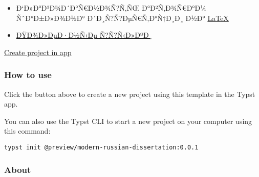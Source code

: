 \begin{itemize}
\item
  Ð`Ð»Ð°Ð³Ð¾Ð´Ð°Ñ€Ð½Ð¾Ñ?Ñ‚ÑŒ Ð°Ð²Ñ‚Ð¾Ñ€Ð°Ð¼ ÑˆÐ°Ð±Ð»Ð¾Ð½Ð°
  Ð´Ð¸Ñ?Ñ?ÐµÑ€Ñ‚Ð°Ñ†Ð¸Ð¸ Ð½Ð°
  \href{https://github.com/AndreyAkinshin/Russian-Phd-LaTeX-Dissertation-Template}{LaTeX}
\item
  \href{https://github.com/AndreyAkinshin/Russian-Phd-LaTeX-Dissertation-Template/wiki/Links\#\%D0\%BF\%D1\%80\%D0\%BE\%D1\%87\%D0\%B8\%D0\%B5-\%D1\%80\%D0\%B5\%D0\%BF\%D0\%BE\%D0\%B7\%D0\%B8\%D1\%82\%D0\%BE\%D1\%80\%D0\%B8\%D0\%B8-\%D1\%81-\%D0\%BF\%D0\%BE\%D0\%BB\%D0\%B5\%D0\%B7\%D0\%BD\%D1\%8B\%D0\%BC\%D0\%B8-\%D0\%BF\%D1\%80\%D0\%B8\%D0\%BC\%D0\%B5\%D1\%80\%D0\%B0\%D0\%BC\%D0\%B8}{ÐŸÐ¾Ð»ÐµÐ·Ð½Ñ‹Ðµ
  Ñ?Ñ?Ñ‹Ð»ÐºÐ¸}
\end{itemize}

\href{/app?template=modern-russian-dissertation&version=0.0.1}{Create
project in app}

\subsubsection{How to use}\label{how-to-use}

Click the button above to create a new project using this template in
the Typst app.

You can also use the Typst CLI to start a new project on your computer
using this command:

\begin{verbatim}
typst init @preview/modern-russian-dissertation:0.0.1
\end{verbatim}



\subsubsection{About}\label{about}

